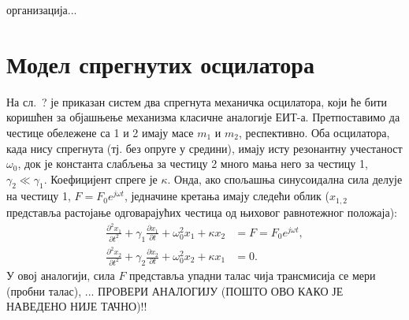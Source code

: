 \documentclass[main.tex]{subfiles}
\begin{document}
организација...

\section{Модел спрегнутих осцилатора}%
\label{sec:model_spregnutikh_ostsilatora}

На сл.~? је приказан систем два спрегнута механичка осцилатора, који ће бити коришћен за објашњење механизма класичне аналогије ЕИТ-а. Претпоставимо да честице обележене са 1 и 2 имају масе $m_1$ и $m_2$, респективно. Оба осцилатора, када нису спрегнута (тј. без опруге у средини), имају исту резонантну учестаност $\omega_0$, док је константа слабљења за честицу 2 много мања него за честицу 1, $\gamma_2\ll\gamma_1$. Коефицијент спреге је $\kappa$. Онда, ако спољашња синусоидална сила делује на честицу 1, $F=F_0e^{j\omega t}$, једначине кретања имају следећи облик ($x_{1,2}$ представља растојање одговарајућих честица од њиховог равнотежног положаја):
\begin{align}
    \label{eq:spreg_osc}
    \frac{\partial^2x_1}{\partial t^2} + \gamma_1 \frac{\partial x_1}{\partial t} + \omega_0^2 x_1 + \kappa x_2 & = F = F_0 e^{j\omega t}, \\
    \frac{\partial^2 x_2}{\partial t^2} + \gamma_2 \frac{\partial x_2}{\partial t} + \omega_0^2 x_2 + \kappa x_1 & = 0.
\end{align}
У овој аналогији, сила $F$ представља упадни талас чија трансмисија се мери (пробни талас), ... ПРОВЕРИ АНАЛОГИЈУ (ПОШТО ОВО КАКО ЈЕ НАВЕДЕНО НИЈЕ ТАЧНО)!!




\end{document}
